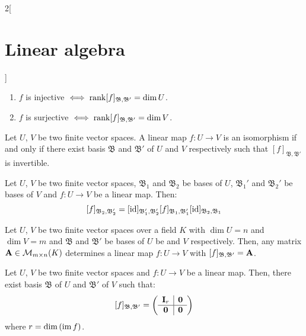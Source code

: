 \documentclass[../../../main.tex]{subfiles}
\begin{document}
\begin{multicols}{2}[\section{Linear algebra}]
\begin{corollary}
    \begin{enumerate}
      \item $f$ is injective $\iff\rank[f]_{\mathfrak{B},\mathfrak{B}'}=\dim U$.
      \item $f$ is surjective $\iff\rank[f]_{\mathfrak{B},\mathfrak{B}'}=\dim V$.
    \end{enumerate}
  \end{corollary}
  \begin{corollary}
    Let $U$, $V$ be two finite vector spaces. A linear map $f:U\rightarrow V$ is an isomorphism if and only if there exist basis $\mathfrak{B}$ and $\mathfrak{B}'$ of $U$ and $V$ respectively such that $[f]_{\mathfrak{B},\mathfrak{B}'}$ is invertible.
  \end{corollary}
  \begin{prop}
    Let $U$, $V$ be two finite vector spaces, $\mathfrak{B}_1$ and $\mathfrak{B}_2$ be bases of $U$, $\mathfrak{B}_1'$ and $\mathfrak{B}_2'$ be bases of $V$ and $f:U\rightarrow V$ be a linear map. Then: $$[f]_{\mathfrak{B}_2,\mathfrak{B}_2'}=[\mathrm{id}]_{\mathfrak{B}_1',\mathfrak{B}_2'}[f]_{\mathfrak{B}_1,\mathfrak{B}_1'}[\mathrm{id}]_{\mathfrak{B}_2,\mathfrak{B}_1}$$
  \end{prop}
  \begin{lemma}
    Let $U$, $V$ be two finite vector spaces over a field $K$ with $\dim U=n$ and $\dim V=m$ and $\mathfrak{B}$ and $\mathfrak{B}'$ be bases of $U$ be and $V$ respectively. Then, any matrix $\boldsymbol{\mathrm{A}}\in\mathcal{M}_{m\times n}(K)$ determines a linear map $f:U\rightarrow V$ with $[f]_{\mathfrak{B},\mathfrak{B}'}=\boldsymbol{\mathrm{A}}$.
  \end{lemma}
  \begin{theorem}
    Let $U$, $V$ be two finite vector spaces and $f:U\rightarrow V$ be a linear map. Then, there exist basis $\mathfrak{B}$ of $U$ and $\mathfrak{B}'$ of $V$ such that:
    $$[f]_{\mathfrak{B},\mathfrak{B}'}=\left(
      \begin{array}{c|c}
          \boldsymbol{\mathrm{I}}_r & \boldsymbol{\mathrm{0}} \\
          \hline
          \boldsymbol{\mathrm{0}}   & \boldsymbol{\mathrm{0}}
        \end{array}\right)$$
    where $r=\dim\left(\operatorname{im} f\right)$.
  \end{theorem}

\end{multicols}
\end{document}
